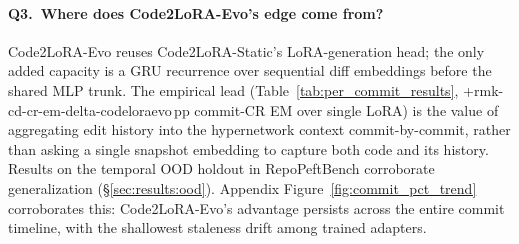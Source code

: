 \documentclass[11pt]{article}
\newcommand{\UseMacro}[1]{\csname rmk-#1\endcsname}
\newcommand{\codelora}{Code2LoRA\xspace}
\newcommand{\repopeftbench}{RepoPeftBench\xspace}
\newcommand{\codelorastatic}{\codelora-Static\xspace}
\newcommand{\codeloraevo}{\codelora-Evo\xspace}
\begin{document}
\paragraph{Q3.\ Where does \codeloraevo{}'s edge come from?}
\codeloraevo{} reuses \codelorastatic{}'s LoRA-generation head; the only added capacity is a GRU recurrence over sequential diff embeddings before the shared MLP trunk.
The empirical lead (Table~\ref{tab:per_commit_results}, +\UseMacro{cd-cr-em-delta-codeloraevo}\,pp commit-CR EM over single LoRA) is the value of aggregating edit history into the hypernetwork context commit-by-commit, rather than asking a single snapshot embedding to capture both code and its history.
Results on the temporal OOD holdout in \repopeftbench{} corroborate generalization (\S\ref{sec:results:ood}).
Appendix Figure~\ref{fig:commit_pct_trend} corroborates this: \codeloraevo{}'s advantage persists across the entire commit timeline, with the shallowest staleness drift among trained adapters.
\end{document}

